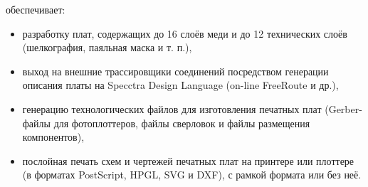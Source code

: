 
обеспечивает:

\begin{itemize}
\item разработку плат, содержащих до 16 слоёв меди и до 12 технических слоёв
  (шелкография, паяльная маска и т. п.), 
\item выход на внешние трассировщики соединений посредством генерации описания 
платы на Specctra Design Language (on-line FreeRoute и др.),
\item генерацию технологических файлов для изготовления печатных плат
(Gerber-файлы для фотоплоттеров, файлы сверловок и файлы размещения компонентов), 
\item послойная печать схем и чертежей печатных плат на принтере или плоттере (в
форматах PostScript, HPGL, SVG и DXF), с рамкой формата или без неё.
\end{itemize}
